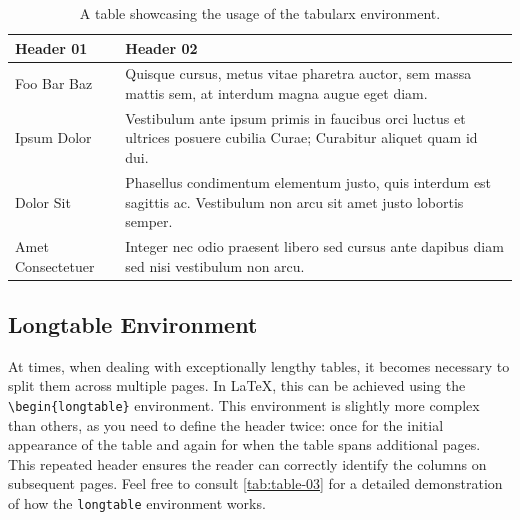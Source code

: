 \begin{table}[!htpb]
    \caption{A table showcasing the usage of the tabularx environment.}
    \label{tab:table-02}
    \begin{tabularx}{\textwidth}{lX}
        \toprule
        \textbf{Header 01} & \textbf{Header 02}                                                                                                        \\
        \midrule
        Foo Bar Baz        & Quisque cursus, metus vitae pharetra auctor, sem massa mattis sem, at interdum magna augue eget diam.                     \\
        Ipsum Dolor        & Vestibulum ante ipsum primis in faucibus orci luctus et ultrices posuere cubilia Curae; Curabitur aliquet quam id dui.    \\
        Dolor Sit          & Phasellus condimentum elementum justo, quis interdum est sagittis ac. Vestibulum non arcu sit amet justo lobortis semper. \\
        Amet Consectetuer  & Integer nec odio praesent libero sed cursus ante dapibus diam sed nisi vestibulum non arcu.                               \\
        \bottomrule
    \end{tabularx}
\end{table}

\subsection{Longtable Environment}
At times, when dealing with exceptionally lengthy tables, it becomes necessary to split them across multiple pages. In \LaTeX, this can be achieved using the \verb|\begin{longtable}| environment. This environment is slightly more complex than others, as you need to define the header twice: once for the initial appearance of the table and again for when the table spans additional pages. This repeated header ensures the reader can correctly identify the columns on subsequent pages. Feel free to consult \autoref{tab:table-03} for a detailed demonstration of how the \verb|longtable| environment works.

